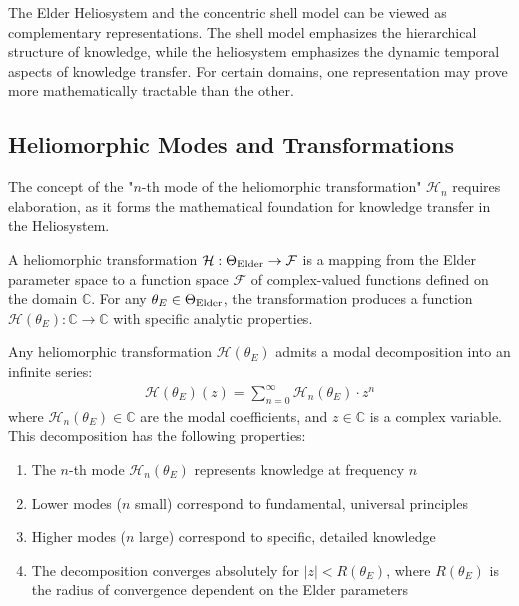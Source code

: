 \begin{remark}
The Elder Heliosystem and the concentric shell model can be viewed as complementary representations. The shell model emphasizes the hierarchical structure of knowledge, while the heliosystem emphasizes the dynamic temporal aspects of knowledge transfer. For certain domains, one representation may prove more mathematically tractable than the other.
\end{remark}

\subsection{Heliomorphic Modes and Transformations}

The concept of the "$n$-th mode of the heliomorphic transformation" $\mathcal{H}_n$ requires elaboration, as it forms the mathematical foundation for knowledge transfer in the Heliosystem.

\begin{definition}
A heliomorphic transformation $\mathcal{H}: \Theta_{\text{Elder}} \rightarrow \mathcal{F}$ is a mapping from the Elder parameter space to a function space $\mathcal{F}$ of complex-valued functions defined on the domain $\mathbb{C}$. For any $\theta_E \in \Theta_{\text{Elder}}$, the transformation produces a function $\mathcal{H}(\theta_E): \mathbb{C} \rightarrow \mathbb{C}$ with specific analytic properties.
\end{definition}

\begin{theorem}
Any heliomorphic transformation $\mathcal{H}(\theta_E)$ admits a modal decomposition into an infinite series:
\begin{align}
\mathcal{H}(\theta_E)(z) = \sum_{n=0}^{\infty} \mathcal{H}_n(\theta_E) \cdot z^n
\end{align}
where $\mathcal{H}_n(\theta_E) \in \mathbb{C}$ are the modal coefficients, and $z \in \mathbb{C}$ is a complex variable. This decomposition has the following properties:
\begin{enumerate}
    \item The $n$-th mode $\mathcal{H}_n(\theta_E)$ represents knowledge at frequency $n$
    \item Lower modes ($n$ small) correspond to fundamental, universal principles
    \item Higher modes ($n$ large) correspond to specific, detailed knowledge
    \item The decomposition converges absolutely for $|z| < R(\theta_E)$, where $R(\theta_E)$ is the radius of convergence dependent on the Elder parameters
\end{enumerate}
\end{theorem}

